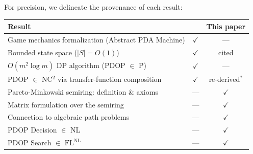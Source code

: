 \documentclass[11pt, letterpaper]{article}
\theoremstyle{definition}
\theoremstyle{remark}
\begin{document}
For precision, we delineate the provenance of each result:
\begin{center}
\small
\begin{tabular}{@{}lcc@{}}
\toprule
\textbf{Result} & \textbf{\cite{Chang2026}} & \textbf{This paper} \\
\midrule
Game mechanics formalization (Abstract PDA Machine) & $\checkmark$ & --- \\
Bounded state space ($|S| = O(1)$) & $\checkmark$ & cited \\
$O(m^2 \log m)$ DP algorithm (PDOP $\in$ P) & $\checkmark$ & --- \\
PDOP $\in$ NC$^2$ via transfer-function composition & $\checkmark$ & re-derived${}^*$ \\
Pareto-Minkowski semiring: definition \& axioms & --- & $\checkmark$ \\
Matrix formulation over the semiring & --- & $\checkmark$ \\
Connection to algebraic path problems & --- & $\checkmark$ \\
PDOP Decision $\in$ NL & --- & $\checkmark$ \\
PDOP Search $\in$ $\mathrm{FL^{NL}}$ & --- & $\checkmark$ \\
\bottomrule
\end{tabular}
\end{center}
\end{document}
